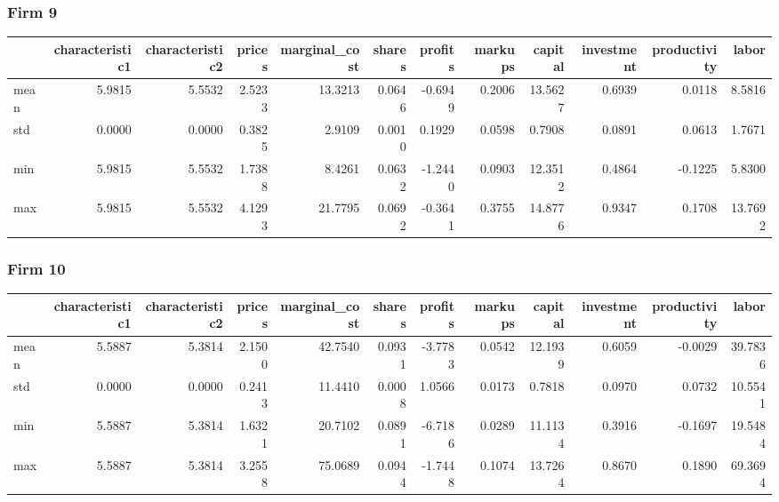  \subsubsection*{Firm 9}
\begin{tabular}{lrrrrrrrrrrr}
\toprule
{} &  characteristic1 &  characteristic2 &  prices &  marginal\_cost &  shares &  profits &  markups &  capital &  investment &  productivity &   labor \\
\midrule
mean &           5.9815 &           5.5532 &  2.5233 &        13.3213 &  0.0646 &  -0.6949 &   0.2006 &  13.5627 &      0.6939 &        0.0118 &  8.5816 \\
std  &           0.0000 &           0.0000 &  0.3825 &         2.9109 &  0.0010 &   0.1929 &   0.0598 &   0.7908 &      0.0891 &        0.0613 &  1.7671 \\
min  &           5.9815 &           5.5532 &  1.7388 &         8.4261 &  0.0632 &  -1.2440 &   0.0903 &  12.3512 &      0.4864 &       -0.1225 &  5.8300 \\
max  &           5.9815 &           5.5532 &  4.1293 &        21.7795 &  0.0692 &  -0.3641 &   0.3755 &  14.8776 &      0.9347 &        0.1708 & 13.7692 \\
\bottomrule
\end{tabular}


 \subsubsection*{Firm 10}
\begin{tabular}{lrrrrrrrrrrr}
\toprule
{} &  characteristic1 &  characteristic2 &  prices &  marginal\_cost &  shares &  profits &  markups &  capital &  investment &  productivity &   labor \\
\midrule
mean &           5.5887 &           5.3814 &  2.1500 &        42.7540 &  0.0931 &  -3.7783 &   0.0542 &  12.1939 &      0.6059 &       -0.0029 & 39.7836 \\
std  &           0.0000 &           0.0000 &  0.2413 &        11.4410 &  0.0008 &   1.0566 &   0.0173 &   0.7818 &      0.0970 &        0.0732 & 10.5541 \\
min  &           5.5887 &           5.3814 &  1.6321 &        20.7102 &  0.0891 &  -6.7186 &   0.0289 &  11.1134 &      0.3916 &       -0.1697 & 19.5484 \\
max  &           5.5887 &           5.3814 &  3.2558 &        75.0689 &  0.0944 &  -1.7448 &   0.1074 &  13.7264 &      0.8670 &        0.1890 & 69.3694 \\
\bottomrule
\end{tabular}


